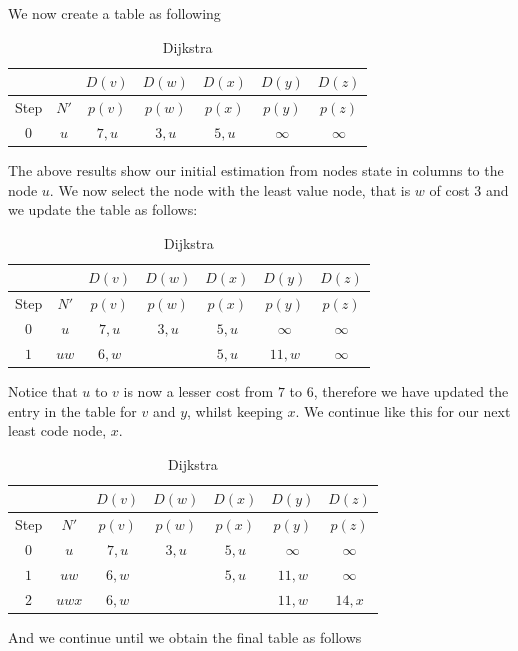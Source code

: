 \documentclass[a4paper]{article}
\theoremstyle{plain}
\theoremstyle{definition}
\newtheorem{exmp}{Example}[section]
\theoremstyle{remark}
\begin{document}
\begin{tcolorbox}[colback=black!3!white,breakable,enhanced,colframe=black!60!white,title=\begin{exmp}Dijkstra's Algorithm \label{Dijkstra's Algorithm}\end{exmp}]
We now create a table as following
\begin{table}[H]
	\centering
	\caption{Dijkstra}
	\label{tab:label}
	\begin{tabular}{|c|c|c|c|c|c|c|}
		& & $D(v)$ & $D(w)$ & $D(x)$ & $D(y)$ & $D(z)$ \\
		\hline
	Step & $N'$ & $p(v)$ & $p(w)$ & $p(x)$ & $p(y)$ & $p(z)$\\
	\hline
	$0$ & $u$ & $7,u$ & $3,u$ & $5,u$ & $\infty$ & $\infty$ \\
	\end{tabular}
\end{table}
The above results show our initial estimation from nodes state in columns to the node $u$. We now select the node with the least value node, that is $w$ of cost $3$ and we update the table as follows:
\begin{table}[H]
	\centering
	\caption{Dijkstra}
	\label{tab:dijkstra}
	\begin{tabular}{|c|c|c|c|c|c|c|}
		& & $D(v)$ & $D(w)$ & $D(x)$ & $D(y)$ & $D(z)$ \\
		\hline
	Step & $N'$ & $p(v)$ & $p(w)$ & $p(x)$ & $p(y)$ & $p(z)$\\
	\hline
	$0$ & $u$ & $7,u$ & $3,u$ & $5,u$ & $\infty$ & $\infty$ \\
	$1$ & $uw $ & $6,w$ & & $5,u$ & $11,w$ & $\infty$ \\
	\end{tabular}
\end{table}
Notice that $u$ to $v$ is now a lesser cost from $7$ to $6$, therefore we have updated the entry in the table for $v$ and $y$, whilst keeping $x$. We continue like this for our next least code node, $x$.
\begin{table}[H]
	\centering
	\caption{Dijkstra}
	\label{tab:dijkstra}
	\begin{tabular}{|c|c|c|c|c|c|c|}
		& & $D(v)$ & $D(w)$ & $D(x)$ & $D(y)$ & $D(z)$ \\
		\hline
	Step & $N'$ & $p(v)$ & $p(w)$ & $p(x)$ & $p(y)$ & $p(z)$\\
	\hline
	$0$ & $u$ & $7,u$ & $3,u$ & $5,u$ & $\infty$ & $\infty$ \\
	$1$ & $uw $ & $6,w$ & & $5,u$ & $11,w$ & $\infty$ \\
	$2$ & $uwx$ & $6,w$ & & &  $11,w$ & $14,x$ \\
	\end{tabular}
\end{table}
And we continue until we obtain the final table as follows
\begin{table}[H]

\end{table}
\end{tcolorbox}
\end{document}
